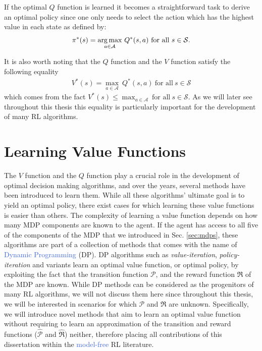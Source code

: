 If the optimal $Q$ function is learned it becomes a straightforward task to derive an optimal policy since one only needs to select the action which has the highest value in each state as defined by:
\begin{equation}
	\pi^{*}(s) = \underset{a\in\mathcal{A}}{\operatorname*{arg\,max}} \ Q^{*}(s,a) \ \text{for all} \ s \in \mathcal{S}.
\end{equation}

It is also worth noting that the $Q$ function and the $V$ function satisfy the following equality
\begin{align}
	V^{*}(s) = \underset{a\in\mathcal{A}}{\max} \ Q^{*}(s,a) \ \text{for all} \ s \in \mathcal{S}
\end{align}
which comes from the fact $V^{*}(s) \leq \max_{a\in\mathcal{A}} \ \text{for all} \ s\in\mathcal{S}$. As we will later see throughout this thesis this equality is particularly important for the development of many RL algorithms.


\section{Learning Value Functions}
\label{sec:learning_value_functions}
The $V$ function and the $Q$ function play a crucial role in the development of optimal decision making algorithms, and over the years, several methods have been introduced to learn them. While all these algorithms' ultimate goal is to yield an optimal policy, there exist cases for which learning these value functions is easier than others. The complexity of learning a value function depends on how many MDP components are known to the agent. If the agent has access to all five of the components of the MDP that we introduced in Sec. \ref{sec:mdps}, these algorithms are part of a collection of methods that comes with the name of \textcolor{RoyalBlue}{Dynamic Programming} (DP). DP algorithms such as \textit{value-iteration}, \textit{policy-iteration} and variants \cite{bertsekas2015value,wei2015value} learn an optimal value function, or optimal policy, by exploiting the fact that the transition function $\mathcal{P}$, and the reward function $\Re$ of the MDP are known. While DP methods can be considered as the progenitors of many RL algorithms, we will not discuss them here since throughout this thesis, we will be interested in scenarios for which $\mathcal{P}$ and $\Re$ are unknown. Specifically, we will introduce novel methods that aim to learn an optimal value function without requiring to learn an approximation of the transition and reward functions ($\widehat{\mathcal{P}}$ and $\widehat{\mathcal{\Re}}$) neither, therefore placing all contributions of this dissertation within the \textcolor{RoyalBlue}{model-free} RL literature. 

